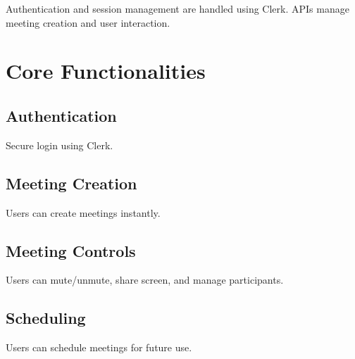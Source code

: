 Authentication and session management are handled using Clerk. APIs manage meeting creation and user interaction.

\section{Core Functionalities}

\subsection{Authentication}
Secure login using Clerk.

\subsection{Meeting Creation}
Users can create meetings instantly.

\subsection{Meeting Controls}
Users can mute/unmute, share screen, and manage participants.

\subsection{Scheduling}
Users can schedule meetings for future use.